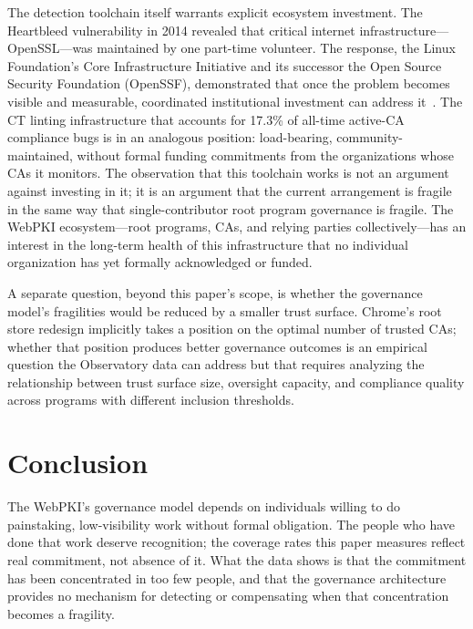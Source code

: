 \documentclass[10pt,twocolumn,letterpaper]{article}
\begin{document}
The detection toolchain itself warrants explicit ecosystem investment.
The Heartbleed vulnerability in 2014 revealed that critical internet
infrastructure---OpenSSL---was maintained by one part-time volunteer.
The response, the Linux Foundation's Core Infrastructure Initiative and
its successor the Open Source Security Foundation (OpenSSF), demonstrated
that once the problem becomes visible and measurable, coordinated
institutional investment can address it~\cite{eghbal2016}. The CT linting
infrastructure that accounts for 17.3\% of all-time active-CA compliance
bugs is in an analogous position: load-bearing, community-maintained,
without formal funding commitments from the organizations whose CAs it
monitors. The observation that this toolchain works is not an argument
against investing in it; it is an argument that the current arrangement
is fragile in the same way that single-contributor root program governance
is fragile. The WebPKI ecosystem---root programs, CAs, and relying parties
collectively---has an interest in the long-term health of this
infrastructure that no individual organization has yet formally
acknowledged or funded.

A separate question, beyond this paper's scope, is whether the governance
model's fragilities would be reduced by a smaller trust surface. Chrome's
root store redesign implicitly takes a position on the optimal number of
trusted CAs; whether that position produces better governance outcomes is
an empirical question the Observatory data can address but that requires
analyzing the relationship between trust surface size, oversight capacity,
and compliance quality across programs with different inclusion
thresholds.

\section{Conclusion}

The WebPKI's governance model depends on individuals willing to do
painstaking, low-visibility work without formal obligation. The people
who have done that work deserve recognition; the coverage rates this paper
measures reflect real commitment, not absence of it. What the data shows
is that the commitment has been concentrated in too few people, and that
the governance architecture provides no mechanism for detecting or
compensating when that concentration becomes a fragility.
\end{document}
